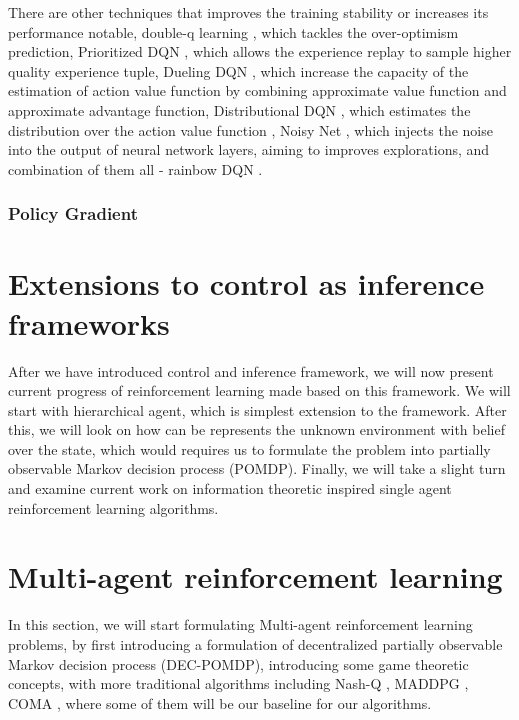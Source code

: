 There are other techniques that improves the training stability or increases its performance notable, double-q learning \cite{van2016deep}, which tackles the over-optimism prediction, Prioritized DQN \cite{schaul2015prioritized}, which allows the experience replay to sample higher quality experience tuple, Dueling DQN \cite{wang2015dueling}, which increase the capacity of the estimation of action value function by combining approximate value function and approximate advantage function, Distributional DQN \cite{bellemare2017distributional}, which estimates the distribution over the action value function \cite{osband2018randomized}, Noisy Net \cite{fortunato2017noisy}, which injects the noise into the output of neural network layers, aiming to improves explorations, and combination of them all - rainbow DQN \cite{hessel2018rainbow}.

\subsubsection{Policy Gradient}


\section{Extensions to control as inference frameworks}
After we have introduced control and inference framework, we will now present current progress of reinforcement learning made based on this framework. We will start with hierarchical agent, which is simplest extension to the framework. After this, we will look on how can be represents the unknown environment with belief over the state, which would requires us to formulate the problem into partially observable Markov decision process (POMDP). Finally, we will take a slight turn and examine current work on information theoretic inspired single agent reinforcement learning algorithms.

\section{Multi-agent reinforcement learning}
In this section, we will start formulating Multi-agent reinforcement learning problems, by first introducing a formulation of decentralized partially observable Markov decision process (DEC-POMDP), introducing some game theoretic concepts, with more traditional algorithms including Nash-Q \cite{hu2003nash}, MADDPG \cite{lowe2017multi}, COMA \cite{foerster2018counterfactual}, where some of them will be our baseline for our algorithms.

